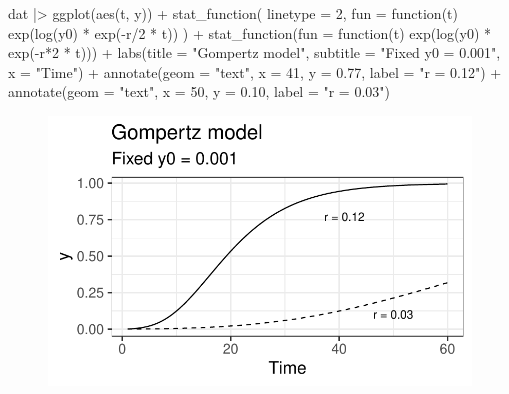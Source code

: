 \documentclass[
  letterpaper,
  DIV=11,
  numbers=noendperiod]{scrreprt}
\newenvironment{Shaded}{\begin{snugshade}}{\end{snugshade}}
\newcommand{\AttributeTok}[1]{\textcolor[rgb]{0.40,0.45,0.13}{#1}}
\newcommand{\ControlFlowTok}[1]{\textcolor[rgb]{0.00,0.23,0.31}{#1}}
\newcommand{\DecValTok}[1]{\textcolor[rgb]{0.68,0.00,0.00}{#1}}
\newcommand{\FloatTok}[1]{\textcolor[rgb]{0.68,0.00,0.00}{#1}}
\newcommand{\FunctionTok}[1]{\textcolor[rgb]{0.28,0.35,0.67}{#1}}
\newcommand{\NormalTok}[1]{\textcolor[rgb]{0.00,0.23,0.31}{#1}}
\newcommand{\SpecialCharTok}[1]{\textcolor[rgb]{0.37,0.37,0.37}{#1}}
\newcommand{\StringTok}[1]{\textcolor[rgb]{0.13,0.47,0.30}{#1}}
\begin{document}
\begin{Shaded}
\begin{Highlighting}[]
\NormalTok{dat }\SpecialCharTok{|\textgreater{}}
  \FunctionTok{ggplot}\NormalTok{(}\FunctionTok{aes}\NormalTok{(t, y)) }\SpecialCharTok{+}
  \FunctionTok{stat\_function}\NormalTok{(}
    \AttributeTok{linetype =} \DecValTok{2}\NormalTok{,}
    \AttributeTok{fun =} \ControlFlowTok{function}\NormalTok{(t) }\FunctionTok{exp}\NormalTok{(}\FunctionTok{log}\NormalTok{(y0) }\SpecialCharTok{*} \FunctionTok{exp}\NormalTok{(}\SpecialCharTok{{-}}\NormalTok{r}\SpecialCharTok{/}\DecValTok{2} \SpecialCharTok{*}\NormalTok{ t))}
\NormalTok{  ) }\SpecialCharTok{+}
  \FunctionTok{stat\_function}\NormalTok{(}\AttributeTok{fun =} \ControlFlowTok{function}\NormalTok{(t) }\FunctionTok{exp}\NormalTok{(}\FunctionTok{log}\NormalTok{(y0) }\SpecialCharTok{*} \FunctionTok{exp}\NormalTok{(}\SpecialCharTok{{-}}\NormalTok{r}\SpecialCharTok{*}\DecValTok{2} \SpecialCharTok{*}\NormalTok{ t))) }\SpecialCharTok{+}
  \FunctionTok{labs}\NormalTok{(}\AttributeTok{title =} \StringTok{"Gompertz model"}\NormalTok{, }\AttributeTok{subtitle =} \StringTok{"Fixed y0 = 0.001"}\NormalTok{, }\AttributeTok{x =} \StringTok{"Time"}\NormalTok{) }\SpecialCharTok{+}
  \FunctionTok{annotate}\NormalTok{(}\AttributeTok{geom =} \StringTok{"text"}\NormalTok{, }\AttributeTok{x =} \DecValTok{41}\NormalTok{, }\AttributeTok{y =} \FloatTok{0.77}\NormalTok{, }\AttributeTok{label =} \StringTok{"r = 0.12"}\NormalTok{) }\SpecialCharTok{+}
  \FunctionTok{annotate}\NormalTok{(}\AttributeTok{geom =} \StringTok{"text"}\NormalTok{, }\AttributeTok{x =} \DecValTok{50}\NormalTok{, }\AttributeTok{y =} \FloatTok{0.10}\NormalTok{, }\AttributeTok{label =} \StringTok{"r = 0.03"}\NormalTok{)}
\end{Highlighting}
\end{Shaded}

\begin{figure}[H]

{\centering \includegraphics{./temporal-models_files/figure-pdf/unnamed-chunk-18-1.pdf}

}

\end{figure}
\end{document}
